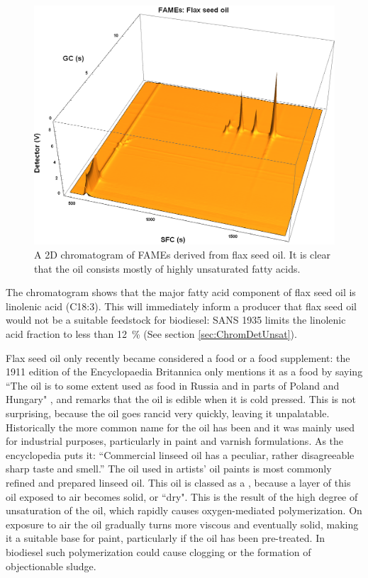 \begin{figure}
\centering
\includegraphics[width=\textwidth]{Figures/Flax44.png}
\decoRule

\caption[SFC×GC of flax seed oil]{A 2D chromatogram of FAMEs derived from
flax seed oil. It is clear that the oil consists mostly of highly unsaturated fatty
acids.}

\label{fig:2DFlax}
\end{figure}

The chromatogram shows that the major fatty acid component of flax seed oil is
linolenic acid (C18:3). This will immediately inform a producer that flax seed
oil would not be a suitable feedstock for biodiesel: SANS 1935 limits the
linolenic acid fraction to less than \SI{12}{\percent} (See section
\ref{sec:ChromDetUnsat}).

Flax seed oil only recently became considered a food or a food supplement: the
1911 edition of the Encyclopaedia Britannica only mentions it as a food by
saying ``The oil is to some extent used as food in Russia and in parts of Poland
and Hungary" \autocite{Linseed1911}, and remarks that the oil is edible when it
is cold pressed. This is not surprising, because the oil goes rancid very
quickly, leaving it unpalatable. Historically the more common name for the oil
has been  and it was mainly used for industrial purposes,
particularly in paint and varnish formulations. As the encyclopedia puts it:
``Commercial linseed oil has a peculiar, rather disagreeable sharp taste and
smell.'' The oil used in artists' oil paints is most commonly refined and
prepared linseed oil. This oil is classed as a , because a
layer of this oil exposed to air becomes solid, or ``dry". This is the result of
the high degree of unsaturation of the oil, which rapidly causes oxygen-mediated
polymerization. On exposure to air the oil gradually turns more viscous and
eventually solid, making it a suitable base for paint, particularly if the oil
has been pre-treated. In biodiesel such polymerization could cause clogging or
the formation of objectionable sludge.

